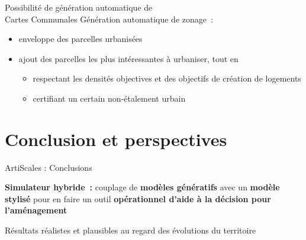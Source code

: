 \documentclass[xcolor=table]{beamer}
\begin{document}
\begin{frame}{Possibilité de génération automatique de \\Cartes Communales}
Génération automatique de zonage~:
\begin{itemize}
	\small
	\item<2-> enveloppe des parcelles urbanisées
	\item<3-> ajout des parcelles les plus intéressantes à urbaniser, tout en 
	\begin{itemize}
			\item<4-> respectant les densités objectives et des objectifs de création de logements
			\item<5-> certifiant un certain non-étalement urbain
	\end{itemize} %
\end{itemize}
\end{frame}




\section{Conclusion et perspectives}



\begin{frame}{ArtiScales : Conclusions}
	\begin{block}{}
		\textbf{Simulateur hybride~:} couplage de \textbf{modèles génératifs} avec un \textbf{modèle stylisé} pour en faire un outil \textbf{opérationnel d'aide à la décision pour l'aménagement}
	\end{block}
	\begin{block}{}
		Résultats réalistes et plausibles au regard des évolutions du territoire
	\end{block}
\end{frame}
\end{document}
